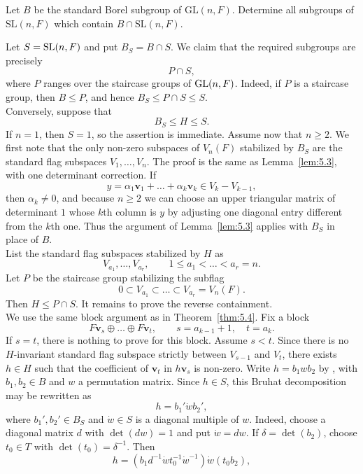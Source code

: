 \documentclass[../Odyssey_Project.tex]{subfiles}
\begin{document}
\begin{exercise}
\label{ex:6.1}
Let $B$ be the standard Borel subgroup of $\mathrm{GL}(n,F)$. Determine all subgroups of $\mathrm{SL}(n,F)$ which contain $B \cap \mathrm{SL}(n,F)$.
\end{exercise}
\begin{solution}
Let $S=\operatorname{SL}(n,F)$ and put $B_S=B\cap S$. We claim that the required subgroups are precisely
\[
    P\cap S,
\]
where $P$ ranges over the staircase groups of $\operatorname{GL}(n,F)$. Indeed, if $P$ is a staircase group, then $B\leq P$, and hence $B_S\leq P\cap S\leq S$.\\
Conversely, suppose that
\[
    B_S\leq H\leq S.
\]
If $n=1$, then $S=1$, so the assertion is immediate. Assume now that $n\geq2$. We first note that the only non-zero subspaces of $V_n(F)$ stabilized by $B_S$ are the standard flag subspaces $V_1,\ldots,V_n$. The proof is the same as Lemma~\ref{lem:5.3}, with one determinant correction. If
\[
    y=\alpha_1\mathbf{v}_1+\dots+\alpha_k\mathbf{v}_k\in V_k-V_{k-1},
\]
then $\alpha_k\neq0$, and because $n\geq2$ we can choose an upper triangular matrix of determinant $1$ whose $k$th column is $y$ by adjusting one diagonal entry different from the $k$th one. Thus the argument of Lemma~\ref{lem:5.3} applies with $B_S$ in place of $B$.\\
List the standard flag subspaces stabilized by $H$ as
\[
    V_{a_1},\ldots,V_{a_r},
    \qquad
    1\leq a_1<\dots<a_r=n.
\]
Let $P$ be the staircase group stabilizing the subflag
\[
    0\subset V_{a_1}\subset\dots\subset V_{a_r}=V_n(F).
\]
Then $H\leq P\cap S$. It remains to prove the reverse containment.\\
We use the same block argument as in Theorem~\ref{thm:5.4}. Fix a block
\[
    F\mathbf{v}_s\oplus\dots\oplus F\mathbf{v}_t,
    \qquad
    s=a_{k-1}+1,\quad t=a_k.
\]
If $s=t$, there is nothing to prove for this block. Assume $s<t$. Since there is no $H$-invariant standard flag subspace strictly between $V_{s-1}$ and $V_t$, there exists $h\in H$ such that the coefficient of $\mathbf{v}_t$ in $h\mathbf{v}_s$ is non-zero. Write $h=b_1wb_2$ by , with $b_1,b_2\in B$ and $w$ a permutation matrix. Since $h\in S$, this Bruhat decomposition may be rewritten as
\[
    h=b_1'\dot{w}b_2',
\]
where $b_1',b_2'\in B_S$ and $\dot{w}\in S$ is a diagonal multiple of $w$. Indeed, choose a diagonal matrix $d$ with $\det(dw)=1$ and put $\dot{w}=dw$. If $\delta=\det(b_2)$, choose $t_0\in T$ with $\det(t_0)=\delta^{-1}$. Then
\[
    h=(b_1d^{-1}\dot{w}t_0^{-1}\dot{w}^{-1})\dot{w}(t_0b_2),
\]
\end{solution}
\end{document}

